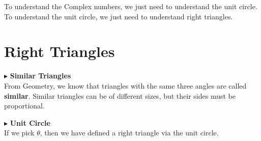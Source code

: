 \documentclass{ximera}
\begin{document}
To understand the Complex numbers, we just need to understand the unit circle.  To understand the unit circle, we just need to understand right triangles.







\section{Right Triangles}




$\blacktriangleright$ \textbf{Similar Triangles} \\

From Geometry, we know that triangles with the same three angles are called \textbf{similar}.  Similar triangles can be of different sizes, but their sides must be proportional.







$\blacktriangleright$ \textbf{Unit Circle} \\




If we pick $\theta$, then we have defined a right triangle via the unit circle.
\end{document}
